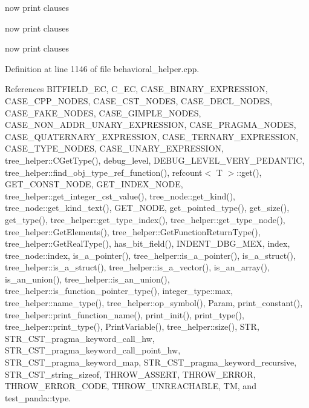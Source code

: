 now print clauses

now print clauses

now print clauses 

Definition at line 1146 of file behavioral\+\_\+helper.\+cpp.



References B\+I\+T\+F\+I\+E\+L\+D\+\_\+\+EC, C\+\_\+\+EC, C\+A\+S\+E\+\_\+\+B\+I\+N\+A\+R\+Y\+\_\+\+E\+X\+P\+R\+E\+S\+S\+I\+ON, C\+A\+S\+E\+\_\+\+C\+P\+P\+\_\+\+N\+O\+D\+ES, C\+A\+S\+E\+\_\+\+C\+S\+T\+\_\+\+N\+O\+D\+ES, C\+A\+S\+E\+\_\+\+D\+E\+C\+L\+\_\+\+N\+O\+D\+ES, C\+A\+S\+E\+\_\+\+F\+A\+K\+E\+\_\+\+N\+O\+D\+ES, C\+A\+S\+E\+\_\+\+G\+I\+M\+P\+L\+E\+\_\+\+N\+O\+D\+ES, C\+A\+S\+E\+\_\+\+N\+O\+N\+\_\+\+A\+D\+D\+R\+\_\+\+U\+N\+A\+R\+Y\+\_\+\+E\+X\+P\+R\+E\+S\+S\+I\+ON, C\+A\+S\+E\+\_\+\+P\+R\+A\+G\+M\+A\+\_\+\+N\+O\+D\+ES, C\+A\+S\+E\+\_\+\+Q\+U\+A\+T\+E\+R\+N\+A\+R\+Y\+\_\+\+E\+X\+P\+R\+E\+S\+S\+I\+ON, C\+A\+S\+E\+\_\+\+T\+E\+R\+N\+A\+R\+Y\+\_\+\+E\+X\+P\+R\+E\+S\+S\+I\+ON, C\+A\+S\+E\+\_\+\+T\+Y\+P\+E\+\_\+\+N\+O\+D\+ES, C\+A\+S\+E\+\_\+\+U\+N\+A\+R\+Y\+\_\+\+E\+X\+P\+R\+E\+S\+S\+I\+ON, tree\+\_\+helper\+::\+C\+Get\+Type(), debug\+\_\+level, D\+E\+B\+U\+G\+\_\+\+L\+E\+V\+E\+L\+\_\+\+V\+E\+R\+Y\+\_\+\+P\+E\+D\+A\+N\+T\+IC, tree\+\_\+helper\+::find\+\_\+obj\+\_\+type\+\_\+ref\+\_\+function(), refcount$<$ T $>$\+::get(), G\+E\+T\+\_\+\+C\+O\+N\+S\+T\+\_\+\+N\+O\+DE, G\+E\+T\+\_\+\+I\+N\+D\+E\+X\+\_\+\+N\+O\+DE, tree\+\_\+helper\+::get\+\_\+integer\+\_\+cst\+\_\+value(), tree\+\_\+node\+::get\+\_\+kind(), tree\+\_\+node\+::get\+\_\+kind\+\_\+text(), G\+E\+T\+\_\+\+N\+O\+DE, get\+\_\+pointed\+\_\+type(), get\+\_\+size(), get\+\_\+type(), tree\+\_\+helper\+::get\+\_\+type\+\_\+index(), tree\+\_\+helper\+::get\+\_\+type\+\_\+node(), tree\+\_\+helper\+::\+Get\+Elements(), tree\+\_\+helper\+::\+Get\+Function\+Return\+Type(), tree\+\_\+helper\+::\+Get\+Real\+Type(), has\+\_\+bit\+\_\+field(), I\+N\+D\+E\+N\+T\+\_\+\+D\+B\+G\+\_\+\+M\+EX, index, tree\+\_\+node\+::index, is\+\_\+a\+\_\+pointer(), tree\+\_\+helper\+::is\+\_\+a\+\_\+pointer(), is\+\_\+a\+\_\+struct(), tree\+\_\+helper\+::is\+\_\+a\+\_\+struct(), tree\+\_\+helper\+::is\+\_\+a\+\_\+vector(), is\+\_\+an\+\_\+array(), is\+\_\+an\+\_\+union(), tree\+\_\+helper\+::is\+\_\+an\+\_\+union(), tree\+\_\+helper\+::is\+\_\+function\+\_\+pointer\+\_\+type(), integer\+\_\+type\+::max, tree\+\_\+helper\+::name\+\_\+type(), tree\+\_\+helper\+::op\+\_\+symbol(), Param, print\+\_\+constant(), tree\+\_\+helper\+::print\+\_\+function\+\_\+name(), print\+\_\+init(), print\+\_\+type(), tree\+\_\+helper\+::print\+\_\+type(), Print\+Variable(), tree\+\_\+helper\+::size(), S\+TR, S\+T\+R\+\_\+\+C\+S\+T\+\_\+pragma\+\_\+keyword\+\_\+call\+\_\+hw, S\+T\+R\+\_\+\+C\+S\+T\+\_\+pragma\+\_\+keyword\+\_\+call\+\_\+point\+\_\+hw, S\+T\+R\+\_\+\+C\+S\+T\+\_\+pragma\+\_\+keyword\+\_\+map, S\+T\+R\+\_\+\+C\+S\+T\+\_\+pragma\+\_\+keyword\+\_\+recursive, S\+T\+R\+\_\+\+C\+S\+T\+\_\+string\+\_\+sizeof, T\+H\+R\+O\+W\+\_\+\+A\+S\+S\+E\+RT, T\+H\+R\+O\+W\+\_\+\+E\+R\+R\+OR, T\+H\+R\+O\+W\+\_\+\+E\+R\+R\+O\+R\+\_\+\+C\+O\+DE, T\+H\+R\+O\+W\+\_\+\+U\+N\+R\+E\+A\+C\+H\+A\+B\+LE, TM, and test\+\_\+panda\+::type.




